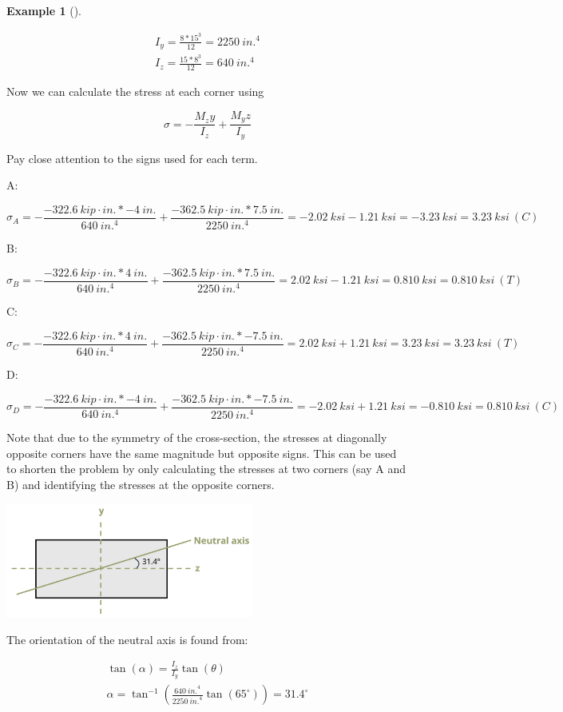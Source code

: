 \documentclass[
  letterpaper,
  DIV=11,
  numbers=noendperiod]{scrreprt}
\theoremstyle{definition}
\newtheorem{example}{Example}[chapter]
\theoremstyle{remark}
\begin{document}
\begin{tcolorbox}
\begin{example}[]
\begin{tcolorbox}
\[
\begin{gathered}
I_y=\frac{8 * 15^3}{12}=2250{~in.}^4 \\
I_z=\frac{15 * 8^3}{12}=640{~in.}^4
\end{gathered}
\]

Now we can calculate the stress at each corner using

\[
\sigma=-\frac{M_z y}{I_z}+\frac{M_y z}{I_y}
\]

Pay close attention to the signs used for each term.

A:

\[
\sigma_A=-\frac{-322.6{~kip}\cdot{in.} *-4{~in.}}{640{~in.}^4}+\frac{-362.5{~kip}\cdot{in.} * 7.5{~in.}}{2250{~in.}^4}=-2.02{~ksi}-1.21{~ksi}=-3.23{~ksi}=3.23{~ksi}~(C)
\]

B:

\[
\sigma_B=-\frac{-322.6{~kip}\cdot{in.} * 4{~in.}}{640{~in.}^4}+\frac{-362.5{~kip}\cdot{in.} * 7.5{~in.}}{2250{~in.}^4}=2.02{~ksi}-1.21{~ksi}=0.810{~ksi}=0.810{~ksi }~(T)
\]

C:

\[
\sigma_C=-\frac{-322.6{~kip}\cdot{in.} * 4{~in.}}{640{~in.}^4}+\frac{-362.5{~kip}\cdot{in.} *-7.5{~in.}}{2250{~in.}^4}=2.02{~ksi}+1.21{~ksi}=3.23{~ksi}=3.23{~ksi}~(T)
\]

D:

\[
\sigma_D=-\frac{-322.6{~kip}\cdot{in.} *-4{~in.}}{640{~in.^4}}+\frac{-362.5{~kip}\cdot{in.} *-7.5{~in.}}{2250{~in.}^4}=-2.02{~ksi}+1.21{~ksi}=-0.810{~ksi}=0.810{~ksi}~(C)
\]

Note that due to the symmetry of the cross-section, the stresses at
diagonally opposite corners have the same magnitude but opposite signs.
This can be used to shorten the problem by only calculating the stresses
at two corners (say A and B) and identifying the stresses at the
opposite corners.

\begin{center}
\includegraphics[width=3.20833in,height=\textheight]{images/CH9 PNGs/Example 9.5 part 2.png}
\end{center}

The orientation of the neutral axis is found from:

\[
\begin{gathered}
\tan (\alpha)=\frac{I_z}{I_y} \tan (\theta) \\
\alpha=\tan ^{-1}\left(\frac{640{~in.}^4}{2250{~in.}^4} \tan \left(65^{\circ}\right)\right)=31.4^{\circ}
\end{gathered}
\]

\end{tcolorbox}

\end{example}

\end{tcolorbox}
\end{document}
